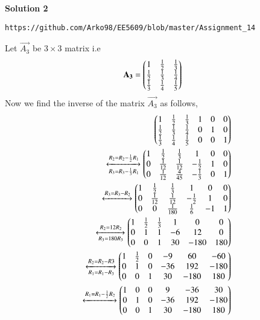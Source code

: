 {\textbf{Solution 2}}
\begin{lstlisting}
https://github.com/Arko98/EE5609/blob/master/Assignment_14
\end{lstlisting}
\begin{comment}
Let $\vec{H_n}$ be the $n$-th Hilbert matrix given by
\begin{align}
\vec{H_n} &= \left[\frac1{i+j-1}\right]_{i,j}\\
\intertext{Then $\vec{H_{n+1}}$ is given by,}
\vec{H_{n+1}} &= \myvec{\vec{H_n}&\vec{u}\\\vec{u^T}&\frac{1}{2n-1}}
\end{align}
\end{comment}
Let $\vec{A_3}$ be $3 \times 3$ matrix i.e
\begin{align}
\mathbf{A_3} &= \begin{pmatrix}1&\frac{1}{2}&\frac{1}{3}\\\frac{1}{2}&\frac{1}{3}&\frac{1}{4}\\\frac{1}{3}&\frac{1}{4}&\frac{1}{5}\end{pmatrix}
\end{align}
Now we find the inverse of the matrix $\vec{A_3}$ as follows,
\begin{align}
\begin{pmatrix}1&\frac{1}{2}&\frac{1}{3}&1&0&0\\\frac{1}{2}&\frac{1}{3}&\frac{1}{4}&0&1&0\\\frac{1}{3}&\frac{1}{4}&\frac{1}{5}&0&0&1\end{pmatrix}\\
\xleftrightarrow[R_3 = R_3 - \frac{1}{3}R_1]{R_2 = R_2 - \frac{1}{2}R_1}\begin{pmatrix}1&\frac{1}{2}&\frac{1}{3}&1&0&0\\0&\frac{1}{12}&\frac{1}{12}&-\frac{1}{2}&1&0\\0&\frac{1}{12}&\frac{4}{45}&-\frac{1}{3}&0&1\end{pmatrix}\\
\xleftrightarrow[]{R_3 = R_3 - R_2}\begin{pmatrix}1&\frac{1}{2}&\frac{1}{3}&1&0&0\\0&\frac{1}{12}&\frac{1}{12}&-\frac{1}{2}&1&0\\0&0&\frac{1}{180}&\frac{1}{6}&-1&1\end{pmatrix}\\
\xleftrightarrow[R_3 = 180R_3]{R_2 = 12R_2}\begin{pmatrix}1&\frac{1}{2}&\frac{1}{3}&1&0&0\\0&1&1&-6&12&0\\0&0&1&30&-180&180\end{pmatrix}\\
\xleftrightarrow[R_1=R_1-R_3]{R_2 = R_2 - R3}\begin{pmatrix}1&\frac{1}{2}&0&-9&60&-60\\0&1&0&-36&192&-180\\0&0&1&30&-180&180\end{pmatrix}\\
\xleftrightarrow{R_1 =R_1-\frac{1}{2}R_2}\begin{pmatrix}1&0&0&9&-36&30\\0&1&0&-36&192&-180\\0&0&1&30&-180&180\end{pmatrix}
\end{align}

